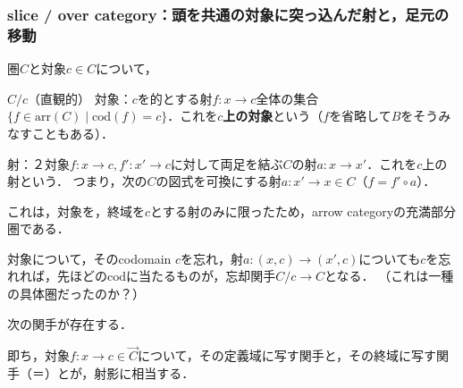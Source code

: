 \documentclass[uplatex, dvipdfmx]{jsarticle}
\begin{document}
\subsubsection{slice / over category：頭を共通の対象に突っ込んだ射と，足元の移動}

圏$C$と対象$c\in C$について，
\begin{itembox}[l]{$C/c$（直観的）}
    対象：$c$を的とする射$f:x\to c$全体の集合$\{ f\in\mathrm{arr}(C)\mid \mathrm{cod}(f)=c \}$．これを\textbf{$c$上の対象}という（$f$を省略して$B$をそうみなすこともある）．
    
    射：２対象$f:x\to c, f':x'\to c$に対して両足を結ぶ$C$の射$a:x\to x'$．これを$c$上の射という．
    つまり，次の$C$の図式を可換にする射$a:x'\to x\in C$（$f=f'\circ a$）．
    \begin{center}\end{center}
\end{itembox}
\begin{proposition*}
    これは，対象を，終域を$c$とする射のみに限ったため，arrow categoryの充満部分圏である．
\end{proposition*}

対象について，そのcodomain $c$を忘れ，射$a:(x,c)\to (x',c)$についても$c$を忘れれば，先ほどの$\mathrm{cod}$に当たるものが，忘却関手$C/c\to C$となる．
（これは一種の具体圏だったのか？）
\begin{proposition*}
    次の関手が存在する．
\begin{center}\end{center}
    即ち，対象$f:x\to c\in\overrightarrow{C}$について，その定義域に写す関手と，その終域に写す関手（＝）とが，射影に相当する．
\end{proposition*}
\end{document}
